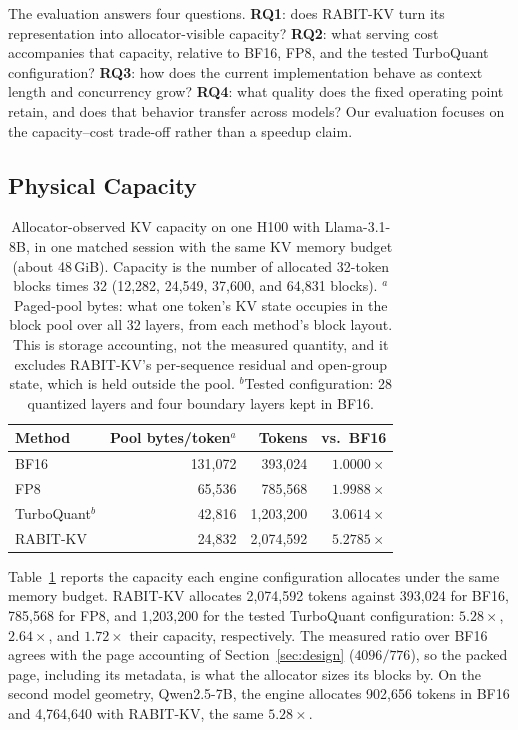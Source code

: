 \documentclass{article}
\begin{document}
The evaluation answers four questions. \textbf{RQ1}: does RABIT-KV turn its representation into
allocator-visible capacity? \textbf{RQ2}: what serving cost accompanies that capacity, relative to
BF16, FP8, and the tested TurboQuant configuration? \textbf{RQ3}: how does the current implementation
behave as context length and concurrency grow? \textbf{RQ4}: what quality does the fixed operating
point retain, and does that behavior transfer across models? Our evaluation focuses on the
capacity--cost trade-off rather than a speedup claim.

\subsection{Physical Capacity}
\label{sec:capacity}

\begin{table}[t]
\centering
\small
\setlength{\tabcolsep}{4pt}
\begin{tabular}{@{}lrrr@{}}
\toprule
Method & Pool bytes/token$^{a}$ & Tokens & vs.\ BF16 \\
\midrule
BF16 & 131,072 & 393,024 & $1.0000\times$ \\
FP8 & 65,536 & 785,568 & $1.9988\times$ \\
TurboQuant$^{b}$ & 42,816 & 1,203,200 & $3.0614\times$ \\
RABIT-KV & 24,832 & 2,074,592 & $5.2785\times$ \\
\bottomrule
\end{tabular}
\caption{Allocator-observed KV capacity on one H100 with Llama-3.1-8B, in one matched session with the
same KV memory budget (about 48\,GiB). Capacity is the number of allocated 32-token blocks times 32 (12,282, 24,549, 37,600, and 64,831 blocks).
$^{a}$Paged-pool bytes: what one token's KV state occupies in the block pool over all 32 layers, from
each method's block layout. This is storage accounting, not the measured quantity, and it excludes
RABIT-KV's per-sequence residual and open-group state, which is held outside the pool. $^{b}$Tested configuration: 28
quantized layers and four boundary layers kept in BF16.}
\label{tab:capacity}
\end{table}

Table~\ref{tab:capacity} reports the capacity each engine configuration allocates under the same memory
budget. RABIT-KV allocates 2,074,592 tokens against 393,024 for BF16, 785,568 for FP8, and 1,203,200
for the tested TurboQuant configuration: $5.28\times$, $2.64\times$, and $1.72\times$ their
capacity, respectively. The measured ratio over BF16 agrees with the page accounting of
Section~\ref{sec:design} ($4096/776$), so the packed page, including its metadata, is what the
allocator sizes its blocks by. On the second model geometry, Qwen2.5-7B, the engine allocates 902,656
tokens in BF16 and 4,764,640 with RABIT-KV, the same $5.28\times$.
\end{document}
